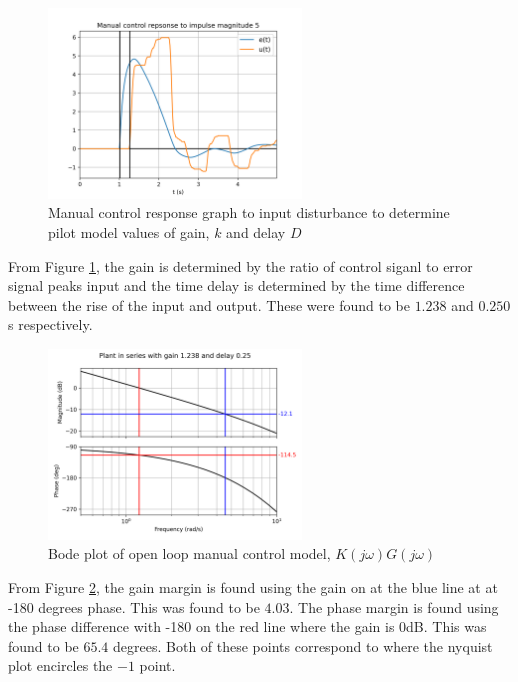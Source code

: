 \documentclass[8pt]{article}
\begin{document}
\begin{figure}[H]
    \centering
    \includegraphics[width=0.6\textwidth]{figures/FIGURE_1.png}
    \caption{Manual control response graph to input disturbance to determine pilot model values of gain, $k$ and delay $D$}
    \label{fig:figure1}
\end{figure}

From Figure \ref{fig:figure1}, the gain is determined by the ratio of control siganl to error signal peaks input and the time delay is determined by the time difference between the rise of the input and output.
These were found to be $1.238$ and $0.250$ s respectively.

\begin{figure}[H]
    \centering
    \includegraphics[width=0.6\textwidth]{figures/FIGURE_2.png}
    \caption{Bode plot of open loop manual control model, $K(j\omega)G(j\omega)$}
    \label{fig:figure2}
\end{figure}

From Figure \ref{fig:figure2}, the gain margin is found using the gain on at the blue line at at -180 degrees phase. This was found to be $4.03$.
The phase margin is found using the phase difference with -180 on the red line where the gain is 0dB. This was found to be $65.4$ degrees. Both of these points correspond to where the nyquist plot encircles the $-1$ point.
\end{document}
